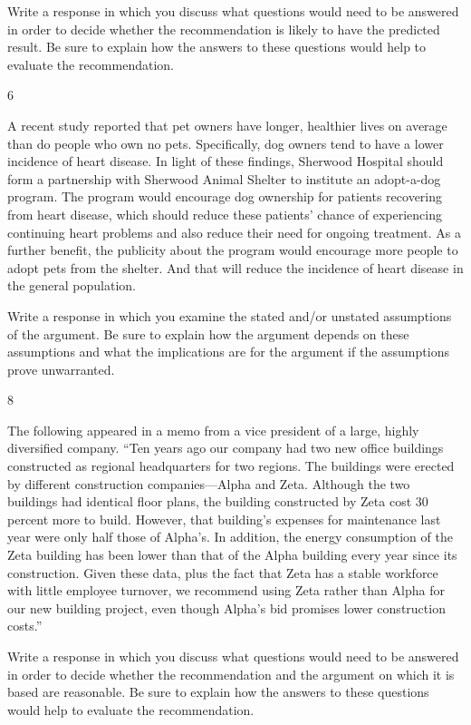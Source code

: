 \documentclass[]{article}
\begin{document}
Write a response in which you discuss what questions would need to be
answered in order to decide whether the recommendation is likely to have
the predicted result. Be sure to explain how the answers to these
questions would help to evaluate the recommendation.

6

A recent study reported that pet owners have longer, healthier lives on
average than do people who own no pets. Specifically, dog owners tend to
have a lower incidence of heart disease. In light of these findings,
Sherwood Hospital should form a partnership with Sherwood Animal Shelter
to institute an adopt-a-dog program. The program would encourage dog
ownership for patients recovering from heart disease, which should
reduce these patients' chance of experiencing continuing heart problems
and also reduce their need for ongoing treatment. As a further benefit,
the publicity about the program would encourage more people to adopt
pets from the shelter. And that will reduce the incidence of heart
disease in the general population.

Write a response in which you examine the stated and/or unstated
assumptions of the argument. Be sure to explain how the argument depends
on these assumptions and what the implications are for the argument if
the assumptions prove unwarranted.

8

The following appeared in a memo from a vice president of a large,
highly diversified company. ``Ten years ago our company had two new
office buildings constructed as regional headquarters for two regions.
The buildings were erected by different construction companies---Alpha
and Zeta. Although the two buildings had identical floor plans, the
building constructed by Zeta cost 30 percent more to build. However,
that building's expenses for maintenance last year were only half those
of Alpha's. In addition, the energy consumption of the Zeta building has
been lower than that of the Alpha building every year since its
construction. Given these data, plus the fact that Zeta has a stable
workforce with little employee turnover, we recommend using Zeta rather
than Alpha for our new building project, even though Alpha's bid
promises lower construction costs.''

Write a response in which you discuss what questions would need to be
answered in order to decide whether the recommendation and the argument
on which it is based are reasonable. Be sure to explain how the answers
to these questions would help to evaluate the recommendation.
\end{document}
